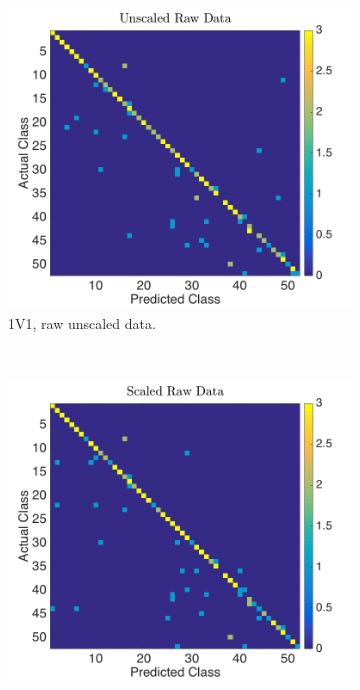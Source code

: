 \documentclass[a4paper, 10pt, conference]{ieeeconf}
\begin{document}
\begin{figure}[!ht]
	\captionsetup[subfigure]{position=b}
        \centering
        \begin{subfigure}{0.2\textwidth}
                \includegraphics[width=\textwidth]{src/1v1_raw_unscaled.png}
                \caption{1V1, raw unscaled data.}
        \end{subfigure}
        ~
        \begin{subfigure}{0.2\textwidth}
          \includegraphics[width=\textwidth]{src/1v1_raw_scaled.png}

\end{subfigure}
\end{figure}
\end{document}
